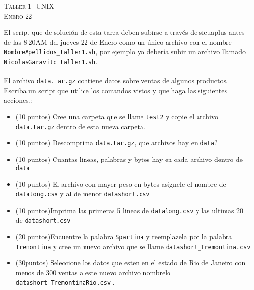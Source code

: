 \documentclass[11pt]{article}
\begin{document}
\begin{center}
\textsc{\LARGE Taller 1- UNIX}\\
\textsc{\large Enero 22 }
\end{center}


El script  que de soluci\'on de esta tarea deben subirse a
trav\'es de sicuaplus antes de las 8:20AM del jueves 22 de Enero como
un \'unico archivo con el nombre
\verb"NombreApellidos_taller1.sh", por ejemplo yo deber\'ia subir un
archivo llamado \verb"NicolasGaravito_taller1.sh".\\
\\
El archivo \verb"data.tar.gz" contiene datos sobre ventas de algunos productos.\\

Escriba un script que utilice los comandos vistos y que haga las siguientes acciones.:
\begin{itemize}
\item (10 puntos) Cree una carpeta que se llame \verb+test2+ y copie el archivo \verb|data.tar.gz| dentro de esta nueva carpeta. 
\item (10 puntos) Descomprima \verb|data.tar.gz|, que archivos hay en \verb|data|?
\item (10 puntos) Cuantas lineas, palabras y bytes hay en cada archivo dentro de \verb|data| 
\item (10 puntos) El archivo con mayor peso en bytes asignele el nombre de \verb|datalong.csv| y al de menor \verb|datashort.csv|
\item (10 puntos)Imprima las primeras 5 lineas de \verb|datalong.csv| y las ultimas 20 de \verb|datashort.csv|
\item (20 puntos)Encuentre la palabra \verb|Spartina| y reemplazela por la palabra \verb|Tremontina| y cree un nuevo archivo que se llame \verb|datashort_Tremontina.csv|

\item (30puntos) Seleccione los datos que esten en el estado de Rio de Janeiro con menos de 300 ventas a este nuevo archivo nombrelo \verb+datashort_TremontinaRio.csv+ .
 
\end{itemize}
\end{document}
